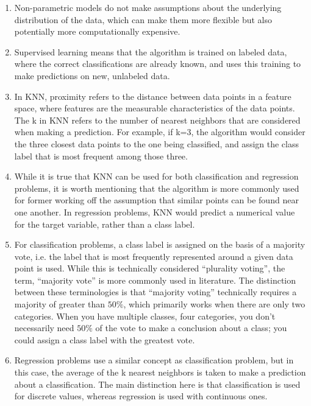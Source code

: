 \documentclass[10pt,a4paper]{article}
\begin{document}
    \begin{enumerate}
    \item Non-parametric models do not make assumptions about the underlying distribution of the data, which can make them more flexible but also potentially more computationally expensive. 
    
    \item Supervised learning means that the algorithm is trained on labeled data, where the correct classifications are already known, and uses this training to make predictions on new, unlabeled data.    
    
    \item In KNN, proximity refers to the distance between data points in a feature space, where features are the measurable characteristics of the data points. The k in KNN refers to the number of nearest neighbors that are considered when making a prediction. For example, if k=3, the algorithm would consider the three closest data points to the one being classified, and assign the class label that is most frequent among those three.
    
    \item While it is true that KNN can be used for both classification and regression  problems, it is worth mentioning that the algorithm is more commonly used for former working off the assumption that similar points can be found near one another. In regression problems, KNN would predict a numerical value for the target variable, rather than a class label.
  
    \item For classification problems, a class label is assigned on the basis of a majority vote, i.e. the label that is most frequently represented around a given data point is used. While this is technically considered “plurality voting”, the term, “majority vote” is more commonly used in literature. The distinction between these terminologies is that “majority voting” technically requires a majority of greater than $50 \%$, which primarily works when there are only two categories. When you have multiple classes, four categories, you don’t necessarily need $50 \%$ of the vote to make a conclusion about a class; you could assign a class label with the greatest vote. 
    
    \item Regression problems use a similar concept as classification problem, but in this case, the average of the k nearest neighbors is taken to make a prediction about a classification. The main distinction here is that classification is used for discrete values, whereas regression is used with continuous ones. 
    

\end{enumerate}
\end{document}
